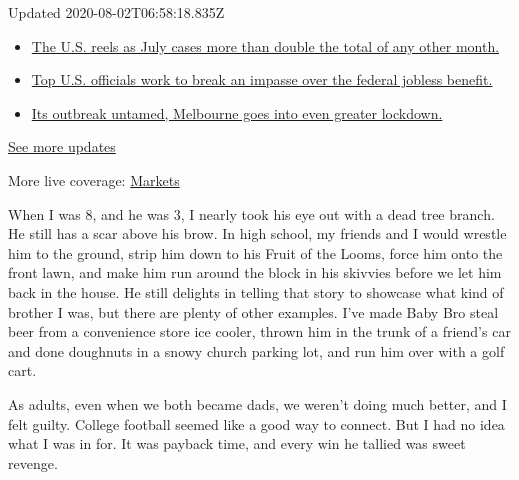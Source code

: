 Updated 2020-08-02T06:58:18.835Z

\begin{itemize}
\tightlist
\item
  \href{https://www.nytimes.com/2020/08/01/world/coronavirus-covid-19.html?action=click\&pgtype=Article\&state=default\&region=MAIN_CONTENT_1\&context=storylines_live_updates\#link-34047410}{The
  U.S. reels as July cases more than double the total of any other
  month.}
\item
  \href{https://www.nytimes.com/2020/08/01/world/coronavirus-covid-19.html?action=click\&pgtype=Article\&state=default\&region=MAIN_CONTENT_1\&context=storylines_live_updates\#link-780ec966}{Top
  U.S. officials work to break an impasse over the federal jobless
  benefit.}
\item
  \href{https://www.nytimes.com/2020/08/01/world/coronavirus-covid-19.html?action=click\&pgtype=Article\&state=default\&region=MAIN_CONTENT_1\&context=storylines_live_updates\#link-2bc8948}{Its
  outbreak untamed, Melbourne goes into even greater lockdown.}
\end{itemize}

\href{https://www.nytimes.com/2020/08/01/world/coronavirus-covid-19.html?action=click\&pgtype=Article\&state=default\&region=MAIN_CONTENT_1\&context=storylines_live_updates}{See
more updates}

More live coverage:
\href{https://www.nytimes.com/live/2020/07/31/business/stock-market-today-coronavirus?action=click\&pgtype=Article\&state=default\&region=MAIN_CONTENT_1\&context=storylines_live_updates}{Markets}

When I was 8, and he was 3, I nearly took his eye out with a dead tree
branch. He still has a scar above his brow. In high school, my friends
and I would wrestle him to the ground, strip him down to his Fruit of
the Looms, force him onto the front lawn, and make him run around the
block in his skivvies before we let him back in the house. He still
delights in telling that story to showcase what kind of brother I was,
but there are plenty of other examples. I've made Baby Bro steal beer
from a convenience store ice cooler, thrown him in the trunk of a
friend's car and done doughnuts in a snowy church parking lot, and run
him over with a golf cart.

As adults, even when we both became dads, we weren't doing much better,
and I felt guilty. College football seemed like a good way to connect.
But I had no idea what I was in for. It was payback time, and every win
he tallied was sweet revenge.

